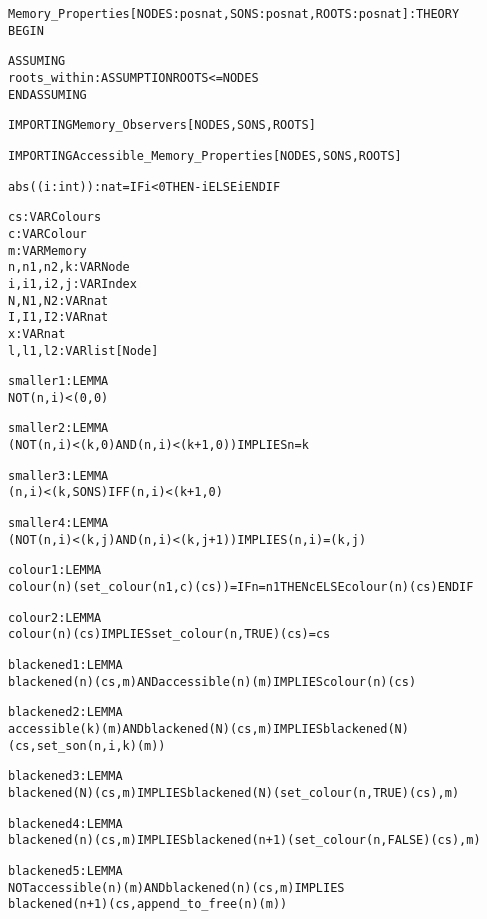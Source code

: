\newpage
\begin{alltt}
%%%%%%%%%%%%%%%%%%%%%%%%%%%%%%%%%%%%%%%%%%%%%%%%%%%%%%
% Memory_Properties :                                %  
%   States lemmas about memory observers.            %
%   These lemmas are needed during invariant proofs. %
%%%%%%%%%%%%%%%%%%%%%%%%%%%%%%%%%%%%%%%%%%%%%%%%%%%%%%

Memory_Properties[NODES: posnat, SONS: posnat, ROOTS: posnat]: THEORY
BEGIN
  
  ASSUMING
    roots_within: ASSUMPTION ROOTS <= NODES
  ENDASSUMING
  
  IMPORTING Memory_Observers[NODES, SONS, ROOTS]
  
  IMPORTING Accessible_Memory_Properties[NODES, SONS, ROOTS]
  
  abs((i: int)): nat = IF i < 0 THEN -i ELSE i ENDIF
  
  cs : VAR Colours
  c : VAR Colour
  m : VAR Memory  
  n, n1, n2, k : VAR Node
  i, i1, i2, j : VAR Index
  N, N1, N2 : VAR nat
  I, I1, I2 : VAR nat
  x : VAR nat
  l, l1, l2 : VAR list[Node]
  
  smaller1 : LEMMA 
    NOT (n, i) < (0, 0)
  
  smaller2 : LEMMA 
    (NOT (n, i) < (k, 0) AND (n, i) < (k + 1, 0)) IMPLIES n = k
  
  smaller3 : LEMMA 
    (n, i) < (k, SONS) IFF (n, i) < (k + 1, 0)
  
  smaller4 : LEMMA 
    (NOT (n, i) < (k, j) AND (n, i) < (k, j + 1)) IMPLIES (n, i) = (k, j)
  
  colour1 : LEMMA 
    colour(n)(set_colour(n1, c)(cs)) = IF n = n1 THEN c ELSE colour(n)(cs) ENDIF
  
  colour2 : LEMMA 
    colour(n)(cs) IMPLIES set_colour(n, TRUE)(cs) = cs
  
  blackened1 : LEMMA 
    blackened(n)(cs, m) AND accessible(n)(m) IMPLIES colour(n)(cs)
  
  blackened2 : LEMMA
    accessible(k)(m) AND blackened(N)(cs, m) IMPLIES blackened(N)(cs, set_son(n, i, k)(m))
  
  blackened3 : LEMMA 
    blackened(N)(cs, m) IMPLIES blackened(N)(set_colour(n, TRUE)(cs), m)
  
  blackened4 : LEMMA 
    blackened(n)(cs, m) IMPLIES blackened(n + 1)(set_colour(n, FALSE)(cs), m)
  
  blackened5: LEMMA
    NOT accessible(n)(m) AND blackened(n)(cs, m) IMPLIES 
      blackened(n + 1)(cs, append_to_free(n)(m))
  

\end{alltt}
